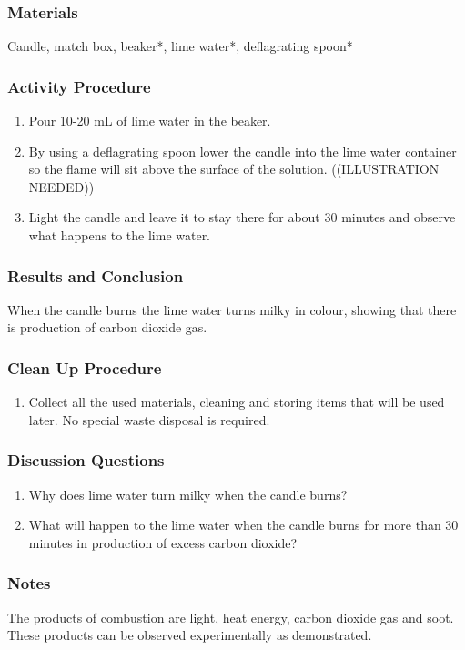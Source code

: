 \subsubsection*{Materials}
Candle, match box, beaker*, lime water*, deflagrating spoon*

\subsubsection*{Activity Procedure}
\begin{enumerate}
\item{Pour 10-20 mL of lime water in the beaker.}
\item{By using a deflagrating spoon lower the candle into the lime water container so the flame will sit above the surface of the solution. ((ILLUSTRATION NEEDED))}
\item{Light the candle and leave it to stay there for about 30 minutes and observe what happens to the lime water.}
\end{enumerate}

\subsubsection*{Results and Conclusion}
When the candle burns the lime water turns milky in colour, showing that there is production of carbon dioxide gas.

\subsubsection*{Clean Up Procedure}
\begin{enumerate}
\item{Collect all the used materials, cleaning and storing items that will be used later. No special waste disposal is required.}
\end{enumerate}

\subsubsection*{Discussion Questions}
\begin{enumerate}
\item{Why does lime water turn milky when the candle burns?}
\item{What will happen to the lime water when the candle burns for more than 30 minutes in production of excess carbon dioxide?}
\end{enumerate}

\subsubsection*{Notes}
The products of combustion are light, heat energy, carbon dioxide gas and soot. These products can be observed experimentally as demonstrated.

